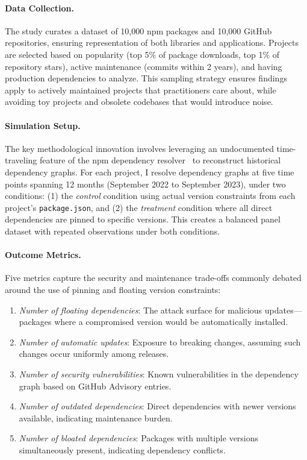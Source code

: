 \paragraph{Data Collection.}
The study curates a dataset of 10,000 npm packages and 10,000 GitHub repositories, ensuring representation of both libraries and applications.
Projects are selected based on popularity (top 5\% of package downloads, top 1\% of repository stars), active maintenance (commits within 2 years), and having production dependencies to analyze.
This sampling strategy ensures findings apply to actively maintained projects that practitioners care about, while avoiding toy projects and obsolete codebases that would introduce noise.

\paragraph{Simulation Setup.}
The key methodological innovation involves leveraging an undocumented time-traveling feature of the npm dependency resolver~\cite{DBLP:conf/msr/PinckneyCGB23} to reconstruct historical dependency graphs.
For each project, I resolve dependency graphs at five time points spanning 12 months (September 2022 to September 2023), under two conditions: (1) the \emph{control} condition using actual version constraints from each project's \texttt{package.json}, and (2) the \emph{treatment} condition where all direct dependencies are pinned to specific versions.
This creates a balanced panel dataset with repeated observations under both conditions.

\paragraph{Outcome Metrics.}
Five metrics capture the security and maintenance trade-offs commonly debated around the use of pinning and floating version constraints:
\begin{enumerate}[leftmargin=15pt]
    \item \emph{Number of floating dependencies}: The attack surface for malicious updates---packages where a compromised version would be automatically installed.
    \item \emph{Number of automatic updates}: Exposure to breaking changes, assuming such changes occur uniformly among releases.
    \item \emph{Number of security vulnerabilities}: Known vulnerabilities in the dependency graph based on GitHub Advisory entries.
    \item \emph{Number of outdated dependencies}: Direct dependencies with newer versions available, indicating maintenance burden.
    \item \emph{Number of bloated dependencies}: Packages with multiple versions simultaneously present, indicating dependency conflicts.
\end{enumerate}

